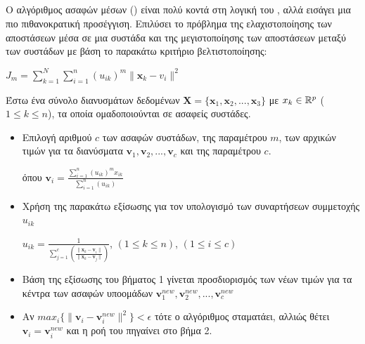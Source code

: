 \subsection{}
Ο αλγόριθμος ασαφών  μέσων () είναι πολύ κοντά στη λογική του , αλλά εισάγει μια πιο πιθανοκρατική προσέγγιση. Επιλύσει το πρόβλημα της ελαχιστοποίησης των αποστάσεων μέσα σε μια συστάδα και της μεγιστοποίησης των αποστάσεων μεταξύ των συστάδων με βάση το παρακάτω κριτήριο βελτιστοποίησης\cite{fuzzyclustering}:
\begin{center}
$J_m = \sum_{k=1}^N\sum_{i=1}^n(u_{ik})^m\|\mathbf{x}_k-v_i\|^2$
\end{center} 
Έστω ένα σύνολο διανυσμάτων δεδομένων $\mathbf{X}=\{\mathbf{x}_1, \mathbf{x}_2, ..., \mathbf{x}_3\}$ με $x_k \in \mathbb{R}^p$ ($1 \leq k \leq n$), τα οποία ομαδοποιούνται σε ασαφείς συστάδες.
\begin{itemize}
\item Επιλογή αριθμού $c$ των ασαφών συστάδων, της παραμέτρου $m$, των αρχικών τιμών για τα διανύσματα  $\mathbf{v}_1, \mathbf{v}_2, ...,\mathbf{v}_c$ και της παραμέτρου $c$.
\begin{center}
    όπου $\mathbf{v}_i=\frac{\sum_{i=1}^n(u_{ik})^mx_{ik}}{\sum_{i=1}^n(u_{ik})}$
\end{center}
\item Χρήση της παρακάτω εξίσωσης για τον υπολογισμό των συναρτήσεων συμμετοχής $u_{ik}$
\begin{center}
$u_{ik}=\frac{1}{\sum_{j=1}^c (\frac{\|\mathbf{x}_k-\mathbf{v}_i\|}{\|\mathbf{x}_k-\mathbf{v}_j\|})}$, $(1 \leq k \leq n)$, $(1 \leq i \leq c)$
\end{center}
\item Βάση της εξίσωσης του βήματος 1 γίνεται προσδιορισμός των νέων τιμών για τα κέντρα των ασαφών υποομάδων $\mathbf{v}_1^{new}, \mathbf{v}_2^{new}, ...,\mathbf{v}_c^{new}$
\item Αν $max_i\{\|\mathbf{v}_i-\mathbf{v}_i^{new}\|^2\}<\epsilon$ τότε ο αλγόριθμος σταματάει, αλλιώς θέτει $\mathbf{v}_i=\mathbf{v}_i^{new}$ και η ροή του πηγαίνει στο βήμα 2.

\end{itemize}
